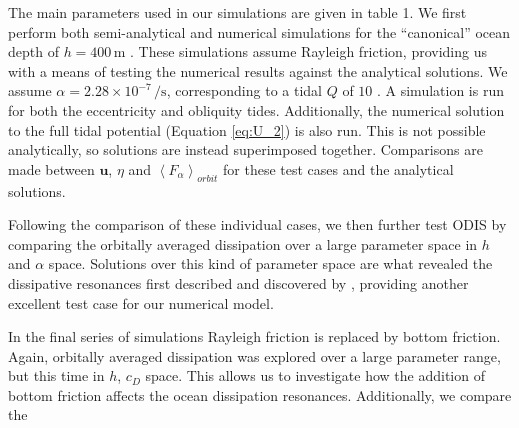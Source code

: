 The main parameters used in our simulations are given in table 1. We first perform both semi-analytical and numerical simulations for the ``canonical'' ocean depth of $h=400 \, \si{\metre}$ \citep{sagan1982tide,sears1995tidal}. These simulations assume Rayleigh friction, providing us with a means of testing the numerical results against the analytical solutions. We assume \hbox{$\alpha = 2.28 \times 10^{-7} \, \si{\per\second}$}, corresponding to a tidal $Q$ of $10$ \citep{tyler2011tidal}. A simulation is run for both the eccentricity and obliquity tides. Additionally, the numerical solution to the full tidal potential (Equation \ref{eq:U_2}) is also run. This is not possible analytically, so solutions are instead superimposed together. Comparisons are made between $\bm{u}$, $\eta$ and $\left\langle F_\alpha \right\rangle_{orbit}$ for these test cases and the analytical solutions. 

Following the comparison of these individual cases, we then further test ODIS by comparing the orbitally averaged dissipation over a large parameter space in $h$ and $\alpha$ space. Solutions over this kind of parameter space are what revealed the dissipative resonances first described and discovered by \citet{tyler2011tidal}, providing another excellent test case for our numerical model.

In the final series of simulations Rayleigh friction is replaced by bottom friction. Again, orbitally averaged dissipation was explored over a large parameter range, but this time in $h$, $c_D$ space. This allows us to investigate how the addition of bottom friction affects the ocean dissipation resonances. Additionally, we compare the  